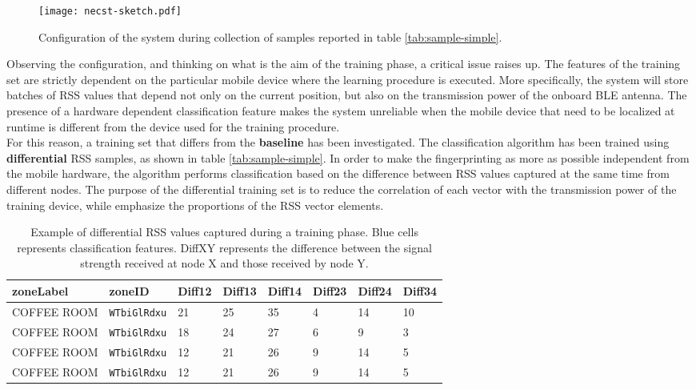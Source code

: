 \begin{figure}[h!tb]
\centering
\texttt{[image: necst-sketch.pdf]}
\caption[Configuration of the system during collection of samples reported in table \ref{tab:sample-simple}.]{Configuration of the system during collection of samples reported in table \ref{tab:sample-simple}.}
\label{fig:necst-sketch}
\end{figure}


Observing the configuration, and thinking on what is the aim of the training phase, a critical issue raises up. The features of the training set are strictly dependent on the particular mobile device where the learning procedure is executed. More specifically, the system will store batches of RSS values that depend not only on the current position, but also on the transmission power of the onboard BLE antenna.
The presence of a hardware dependent classification feature makes the system unreliable when the mobile device that need to be localized at runtime is different from the device used for the training procedure.\\
For this reason, a training set that differs from the \textbf{baseline} has been investigated. The classification algorithm has been trained using \textbf{differential} RSS samples, as shown in table \ref{tab:sample-simple}. In order to make the fingerprinting as more as possible independent from the mobile hardware, the algorithm performs classification based on the difference between RSS values captured at the same time from different nodes. 
The purpose of the differential training set is to reduce the correlation of each vector with the transmission power of the training device, while emphasize the proportions of the RSS vector elements.

\begin{table}[h!tb]
\caption[Example of differential RSS values captured during a training phase.]{Example of differential RSS values captured during a training phase. Blue cells represents classification features. DiffXY represents the difference between the signal strength received at node X and those received by node Y.}
\label{tab:sample-diff}
\begin{center}
\setlength{\tabcolsep}{.35em}
  \begin{tabularx}{\textwidth}{ | Y | Y | a | a | a | a | a | a |}
    \hline
    zoneLabel & zoneID & Diff12 & Diff13 & Diff14 & Diff23 & Diff24 & Diff34\\ \hline
    COFFEE ROOM & \verb|WTbiGlRdxu| & 21 & 25 & 35 & 4 & 14 & 10\\
    COFFEE ROOM & \verb|WTbiGlRdxu| & 18 & 24 & 27 & 6 & 9 & 3\\
    COFFEE ROOM & \verb|WTbiGlRdxu| & 12 & 21 & 26 & 9 & 14 & 5\\
    COFFEE ROOM & \verb|WTbiGlRdxu| & 12 & 21 & 26 & 9 & 14 & 5\\
    \hline
  \end{tabularx}
\end{center}
\end{table}

